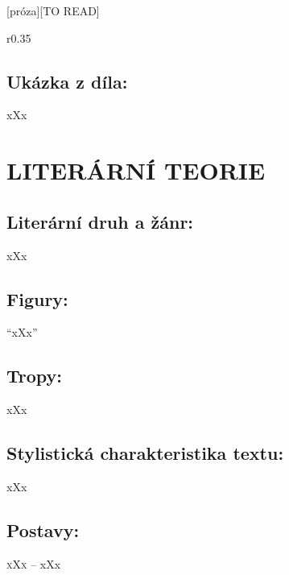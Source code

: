 \documentclass{extarticle} %
\begin{document}
\changefontsize{8pt}

[próza][TO READ]

\noindent\begin{wrapfigure}{r}{0.35\textwidth}
\tiny

\subsection*{Ukázka z díla:}
\setlength{\parindent}{3pt}
xXx
\end{wrapfigure}

\section*{LITERÁRNÍ TEORIE}

\subsection*{Literární druh a žánr:}
\noindent xXx



\subsection*{Figury:}
\noindent 
\enquote{xXx}

\subsection*{Tropy:}
\noindent 
xXx

\subsection*{Stylistická charakteristika textu:}
\noindent 
xXx

\subsection*{Postavy:}
\noindent 
\textsc{xXx --} xXx \\
\end{document}
